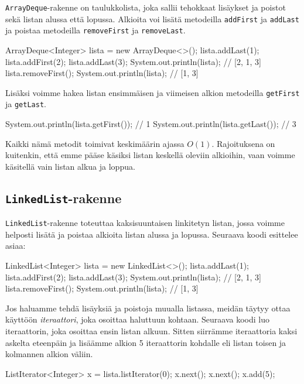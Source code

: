 \texttt{ArrayDeque}-rakenne on taulukkolista,
joka sallii tehokkaat lisäykset ja poistot
sekä listan alussa että lopussa.
Alkioita voi lisätä
metodeilla \texttt{addFirst} ja \texttt{addLast}
ja poistaa
metodeilla \texttt{removeFirst} ja \texttt{removeLast}.

\begin{code}
ArrayDeque<Integer> lista = new ArrayDeque<>();
lista.addLast(1);
lista.addFirst(2);
lista.addLast(3);
System.out.println(lista); // [2, 1, 3]
lista.removeFirst();
System.out.println(lista); // [1, 3]
\end{code}

Lisäksi voimme hakea listan ensimmäisen ja viimeisen
alkion metodeilla \texttt{getFirst} ja \texttt{getLast}.

\begin{code}
System.out.println(lista.getFirst()); // 1
System.out.println(lista.getLast()); // 3
\end{code}

Kaikki nämä metodit toimivat keskimäärin ajassa $O(1)$.
Rajoituksena on kuitenkin, että emme pääse käsiksi
listan keskellä oleviin alkioihin, vaan voimme käsitellä
vain listan alkua ja loppua.

\subsection{\texttt{LinkedList}-rakenne}

\texttt{LinkedList}-rakenne toteuttaa kaksisuuntaisen
linkitetyn listan, jossa voimme helposti lisätä ja poistaa
alkioita listan alussa ja lopussa.
Seuraava koodi esittelee asiaa:

\begin{code}
LinkedList<Integer> lista = new LinkedList<>();
lista.addLast(1);
lista.addFirst(2);
lista.addLast(3);
System.out.println(lista); // [2, 1, 3]
lista.removeFirst();
System.out.println(lista); // [1, 3]
\end{code}

Jos haluamme tehdä lisäyksiä ja poistoja muualla listassa,
meidän täytyy ottaa käyttöön \emph{iteraattori}, joka osoittaa haluttuun kohtaan.
Seuraava koodi luo iteraattorin, joka osoittaa ensin listan alkuun.
Sitten siirrämme iteraattoria kaksi askelta eteenpäin ja
lisäämme alkion 5 iteraattorin kohdalle eli listan
toisen ja kolmannen alkion väliin.

\begin{code}
ListIterator<Integer> x = lista.listIterator(0);
x.next();
x.next();
x.add(5);
\end{code}

